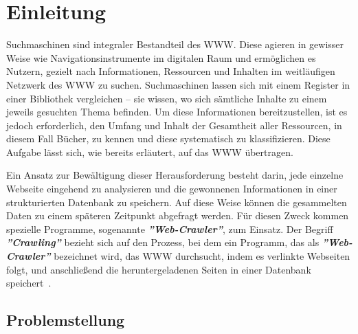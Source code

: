\chapter{Einleitung}
\label{chap:intro}
\chapterstart


Suchmaschinen sind integraler Bestandteil des \ac{WWW}. Diese agieren in gewisser Weise wie Navigationsinstrumente im digitalen Raum und ermöglichen es Nutzern, gezielt nach Informationen, Ressourcen und Inhalten im weitläufigen Netzwerk des \ac{WWW} zu suchen. Suchmaschinen lassen sich mit einem Register in einer Bibliothek vergleichen – sie wissen, wo sich sämtliche Inhalte zu einem jeweils gesuchten Thema befinden. Um diese Informationen bereitzustellen, ist es jedoch erforderlich, den Umfang und Inhalt der Gesamtheit aller Ressourcen, in diesem Fall Bücher, zu kennen und diese systematisch zu klassifizieren. Diese Aufgabe lässt sich, wie bereits erläutert, auf das \ac{WWW} übertragen.\newline

Ein Ansatz zur Bewältigung dieser Herausforderung besteht darin, jede einzelne Webseite eingehend zu analysieren und die gewonnenen Informationen in einer strukturierten Datenbank zu speichern. Auf diese Weise können die gesammelten Daten zu einem späteren Zeitpunkt abgefragt werden. Für diesen Zweck kommen spezielle Programme, sogenannte \textbf{\textit{''Web-Crawler''}}, zum Einsatz. Der Begriff \textbf{\textit{''Crawling''}} bezieht sich auf den Prozess, bei dem ein Programm, das als \textbf{\textit{''Web-Crawler''}} bezeichnet wird, das \ac{WWW} durchsucht, indem es verlinkte Webseiten folgt, und anschließend die heruntergeladenen Seiten in einer Datenbank speichert~\parencite[vgl.][S. 1]{sharma2015anatomy}.
\newpage
\section{Problemstellung}\label{sec:problem}


